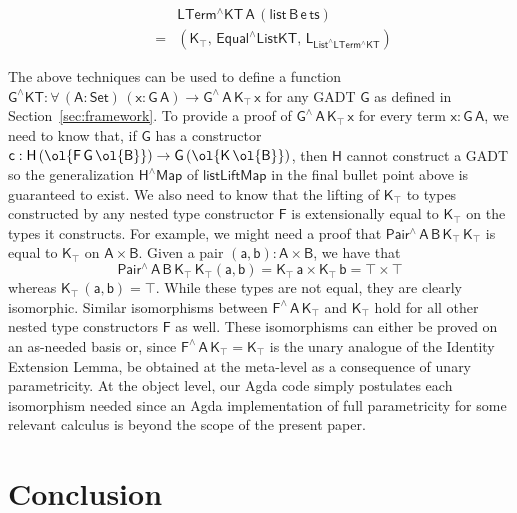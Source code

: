 \documentclass[sigplan,screen]{acmart}
\begin{document}
\begin{itemize}
\pagebreak

\vspace*{-0.35in}

\[\begin{array}{ll}
 & \!\!\mathsf{LTerm^\wedge KT\,A\, (list\, B\, e\,
  ts)}\\
\quad\quad = & \!\!\mathsf{(K_\top , \, Equal^\wedge ListKT , \, L_{List^\wedge
    LTerm^\wedge KT} ) }
\end{array}\]
\end{itemize}

The above techniques can be used to define a function
$\mathsf{G^\wedge KT : \forall\, (A : Set)\, (x : G\,A) \to
  G^{\wedge}\, A\, K_\top\, x}$ for any GADT $\mathsf{G}$ as defined
in Section~\ref{sec:framework}.  To provide a proof of
$\mathsf{G^{\wedge}\, A\, K_\top \, x}$ for every term $\mathsf{x :
  G\, A}$, we need to know that, if $\mathsf{G}$ has a constructor
$\mathsf{c : H \, (\ol{F\,G\, \ol{B}}) \to G\, (\ol{K\,\ol{B}})}$,
then $\mathsf{H}$ cannot construct a GADT so the generalization
$\mathsf{H^\wedge Map}$ of $\mathsf{listLiftMap}$ in the final bullet
point above is guaranteed to exist. We also need to know that the
lifting of $\mathsf{K_\top}$ to types constructed by any nested type
constructor $\mathsf{F}$ is extensionally equal to $\mathsf{K_\top}$
on the types it constructs. For example, we might need a proof that
$\mathsf{Pair^{\wedge}\,A\,B\,K_\top\,K_\top}$ is equal to
$\mathsf{K_\top}$ on $\mathsf{A \times B}$.  Given a pair $\mathsf{(a
  , b) : A \times B}$, we have that
\[\mathsf{Pair^{\wedge}\,A\,B\,K_\top\,K_\top (a, b) = K_\top \, a
  \times K_\top\, b = \top \times \top}\] whereas $\mathsf{K_\top\,
  (a, b) = \top}$. While these types are not equal, they are clearly
isomorphic. Similar isomorphisms between
$\mathsf{F^{\wedge}\,A\,K_\top}$ and $\mathsf{K_\top}$ hold for all
other nested type constructors $\mathsf{F}$ as well. These
isomorphisms can either be proved on an as-needed basis or, since
$\mathsf{F^\wedge\,A\,K_\top = K_\top}$ is the unary analogue of the
Identity Extension Lemma, be obtained at the meta-level as a
consequence of unary parametricity. At the object level, our Agda
code
simply postulates each isomorphism needed since
an Agda implementation of full parametricity for some relevant
calculus is beyond the scope of the present paper.

\section{Conclusion}\label{sec:conclusion}
\end{document}
